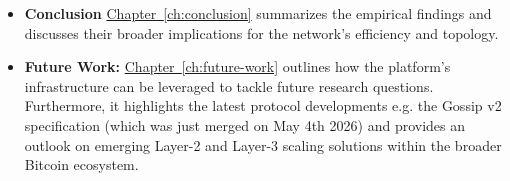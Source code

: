 \begin{itemize}
    \item \textbf{Conclusion} 
        \hyperref[ch:conclusion]{Chapter~\ref*{ch:conclusion}} summarizes the empirical findings and discusses their broader implications 
        for the network's efficiency and topology.
    
    \item \textbf{Future Work:} 
        \hyperref[ch:future-work]{Chapter~\ref*{ch:future-work}} outlines how the platform's infrastructure can be leveraged to tackle future research questions. 
        Furthermore, it highlights the latest protocol developments e.g. the Gossip v2 specification (which was just merged on May 4th 2026) 
        and provides an outlook on emerging Layer-2 and Layer-3 scaling solutions within the broader Bitcoin ecosystem.
\end{itemize}
